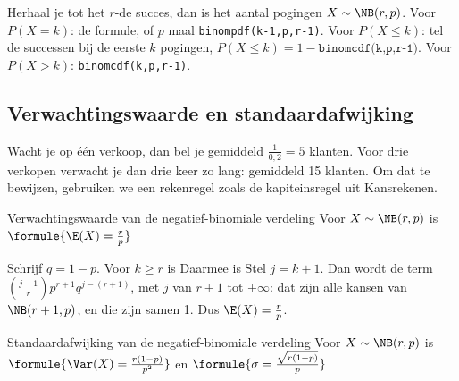 
\begin{werkwijze}
Herhaal je tot het $r$-de succes, dan is het aantal pogingen $X \sim \NB(r, p)$. Voor $P(X = k)$: de formule, of $p$ maal \texttt{binompdf(k-1,p,r-1)}. Voor $P(X \leqslant k)$: tel de successen bij de eerste $k$ pogingen, $P(X \leqslant k) = 1 - \texttt{binomcdf(k,p,r-1)}$. Voor $P(X > k)$: \texttt{binomcdf(k,p,r-1)}.
\end{werkwijze}

\begin{oefeningen}
\end{oefeningen}

\subsection{Verwachtingswaarde en standaardafwijking}

Wacht je op één verkoop, dan bel je gemiddeld $\frac{1}{0{,}2} = 5$ klanten. Voor drie verkopen verwacht je dan drie keer zo lang: gemiddeld 15 klanten. Om dat te bewijzen, gebruiken we een rekenregel zoals de kapiteinsregel uit Kansrekenen.

\begin{theorie}
\begin{stelling}{Verwachtingswaarde van de negatief-binomiale verdeling}
Voor $X \sim \NB(r, p)$ is \quad $\formule{\E(X) = \frac{r}{p}}$
\end{stelling}

\begin{bewijs}
Schrijf $q = 1 - p$. Voor $k \geqslant r$ is
Daarmee is
Stel $j = k + 1$. Dan wordt de term $\binom{j-1}{r}p^{r+1}q^{j-(r+1)}$, met $j$ van $r + 1$ tot $+\infty$: dat zijn alle kansen van $\NB(r + 1, p)$, en die zijn samen 1. Dus $\E(X) = \frac{r}{p}$.
\end{bewijs}

\begin{stelling}{Standaardafwijking van de negatief-binomiale verdeling}
Voor $X \sim \NB(r, p)$ is \quad $\formule{\Var(X) = \frac{r(1 - p)}{p^2}}$ \quad en \quad $\formule{\sigma = \frac{\sqrt{r(1 - p)}}{p}}$
\end{stelling}
\end{theorie}

